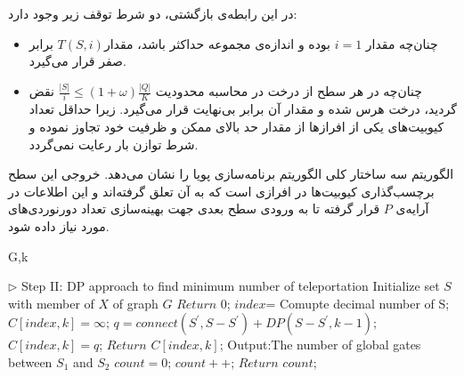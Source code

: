 در این رابطه‌ی بازگشتی، دو شرط توقف زیر وجود دارد:
\begin{itemize}

\item
 چنان‌چه مقدار $i=1 $ بوده و اندازه‌ی مجموعه   حداکثر  باشد، مقدار$T(S,i)$ برابر صفر قرار می‌گیرد.
\item
چنان‌چه در هر سطح از درخت در محاسبه  محدودیت $\frac{|S|}{i} \leq (1+\omega)\frac{|Q|}{K}$ نقض گردید، درخت هرس شده و مقدار آن برابر بی‌نهایت قرار می‌گیرد. زیرا حداقل تعداد کیوبیت‌های یکی از افرازها از مقدار حد بالای ممکن و ظرفیت خود تجاوز نموده و شرط توازن بار رعایت نمی‌گردد.
\end{itemize}

الگوریتم سه ساختار کلی الگوریتم برنامه‌سازی پویا را نشان می‌دهد. خروجی این سطح برچسب‌گذاری کیوبیت‌ها در افرازی است که به آن تعلق گرفته‌اند و این اطلاعات در آرایه‌ی $P$ قرار گرفته تا به ورودی سطح بعدی جهت بهینه‌سازی تعداد دورنوردی‌های مورد نیاز داده شود.


\begin{algorithm}[t]
{
\fontsize{9}{1}
\caption{$\text{: الگوریتم برنامه‌سازی پویا جهت افرازبندی مدار کوانتومی}$}
\begin{algorithmic}[3]
\begin{latin}
 {G,k}

\State\textcolor[rgb]{0.00,0.50,1.00}{ $\triangleright$ Step II: DP approach to find minimum number of  teleportation}
\State Initialize set $S$ with member of $X$ of graph $G$
\State $Return$  0;
\EndIf
\State $index$= Comupte decimal number of S;
\State $ C[index,k]=\infty$;
    \State $q=connect(S^{'},S-S^{'})+DP(S-S^{'},k-1)$;
       \State $C[index,k]=q$;
   \EndIf
\EndFor
\State $Return$  $C[index,k]$;
\EndFunction
{}
\State \textcolor[rgb]{0.00,0.50,1.00}{ Output:The number of global gates between $S_{1}$  and $S_{2}$}
\State $count=0$;
     \State $count++$;
\EndIf
\EndFor
\EndFor
\EndFor
\State $Return$ $count$;
\EndFunction

\end{latin}
\end{algorithmic}
}
\end{algorithm}


